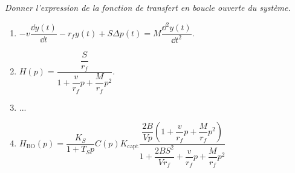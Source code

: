 \subparagraph{}
 \textit{Donner l’expression de la fonction de transfert en boucle ouverte du système.}
\ifprof
\begin{corrige}
\end{corrige}
\else
\fi


\begin{enumerate}
\item $-v \dfrac{\dd y(t)}{\dd t} - r_f y(t) + S\Delta p(t) = M \dfrac{\dd^2 y(t)}{\dd t^2}$.
\item $H(p)=\dfrac{\dfrac{S}{r_f}}{1+\dfrac{v}{r_f}  p +  \dfrac{M}{r_f}  p^2 }$.
\item ...
\item $H_{\text{BO}}(p) = \dfrac{K_S}{1+T_S p}C(p) K_{\text{capt}} \dfrac{\dfrac{2B}{Vp}\left( 1+\dfrac{v}{r_f}  p +  \dfrac{M}{r_f}  p^2\right)}{1+\dfrac{2BS^2}{V r_f} + \dfrac{v}{r_f}  p +  \dfrac{M}{r_f}  p^2}$
\end{enumerate}